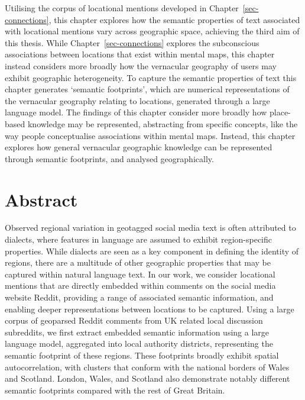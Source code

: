 \documentclass[
  letterpaper,
  11pt,
  english,
  onehalfspacing,
  headsepline]{MastersDoctoralThesis}
\begin{document}
Utilising the corpus of locational mentions developed in
Chapter~\ref{sec-connections}, this chapter explores how the semantic
properties of text associated with locational mentions vary across
geographic space, achieving the third aim of this thesis. While
Chapter~\ref{sec-connections} explores the subconscious associations
between locations that exist within mental maps, this chapter instead
considers more broadly how the vernacular geography of users may exhibit
geographic heterogeneity. To capture the semantic properties of text
this chapter generates `semantic footprints', which are numerical
representations of the vernacular geography relating to locations,
generated through a large language model. The findings of this chapter
consider more broadly how place-based knowledge may be represented,
abstracting from specific concepts, like the way people conceptualise
associations within mental maps. Instead, this chapter explores how
general vernacular geographic knowledge can be represented through
semantic footprints, and analysed geographically.

\hypertarget{abstract-3}{%
\section*{Abstract}\label{abstract-3}}


Observed regional variation in geotagged social media text is often
attributed to dialects, where features in language are assumed to
exhibit region-specific properties. While dialects are seen as a key
component in defining the identity of regions, there are a multitude of
other geographic properties that may be captured within natural language
text. In our work, we consider locational mentions that are directly
embedded within comments on the social media website Reddit, providing a
range of associated semantic information, and enabling deeper
representations between locations to be captured. Using a large corpus
of geoparsed Reddit comments from UK related local discussion
subreddits, we first extract embedded semantic information using a large
language model, aggregated into local authority districts, representing
the semantic footprint of these regions. These footprints broadly
exhibit spatial autocorrelation, with clusters that conform with the
national borders of Wales and Scotland. London, Wales, and Scotland also
demonstrate notably different semantic footprints compared with the rest
of Great Britain.
\end{document}
